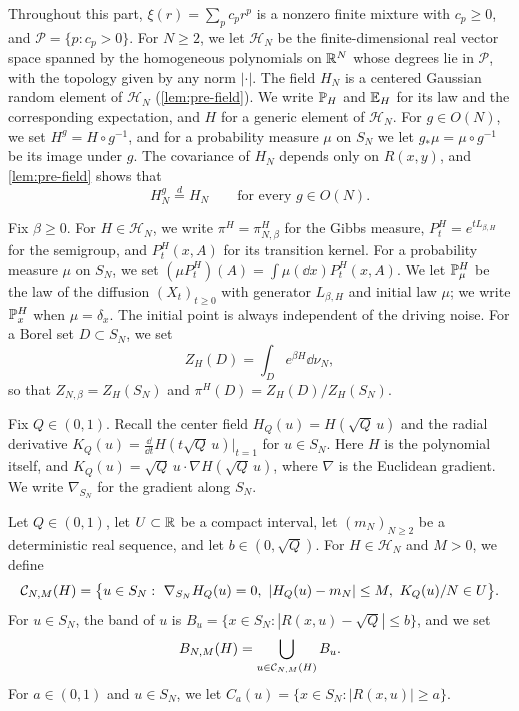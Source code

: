 Throughout this part, $\xi(r)=\sum_pc_pr^p$ is a nonzero finite mixture with $c_p\ge0$, and $\mathcal P=\{p:c_p>0\}$. For $N\ge2$, we let $\mathcal H_N$ be the finite-dimensional real vector space spanned by the homogeneous polynomials on $\mathbb R^N$ whose degrees lie in $\mathcal P$, with the topology given by any norm $|\cdot|$. The field $H_N$ is a centered Gaussian random element of $\mathcal H_N$ (\cref{lem:pre-field}). We write $\mathbb P_H$ and $\mathbb E_H$ for its law and the corresponding expectation, and $H$ for a generic element of $\mathcal H_N$. For $g\in O(N)$, we set $H^g=H\circ g^{-1}$, and for a probability measure $\mu$ on $S_N$ we let $g_*\mu=\mu\circ g^{-1}$ be its image under $g$. The covariance of $H_N$ depends only on $R(x,y)$, and \cref{lem:pre-field} shows that
\begin{equation}\label{eq:red-isotropy}
H_N^g\overset{d}{=}H_N\qquad\text{for every }g\in O(N).
\end{equation}

Fix $\beta\ge0$. For $H\in\mathcal H_N$, we write $\pi^H=\pi^H_{N,\beta}$ for the Gibbs measure, $P^H_t=e^{tL_{\beta,H}}$ for the semigroup, and $P^H_t(x,A)$ for its transition kernel. For a probability measure $\mu$ on $S_N$, we set $(\mu P^H_t)(A)=\int\mu(\dd x)P^H_t(x,A)$. We let $\mathbb P^H_\mu$ be the law of the diffusion $(X_t)_{t\ge0}$ with generator $L_{\beta,H}$ and initial law $\mu$; we write $\mathbb P^H_x$ when $\mu=\delta_x$. The initial point is always independent of the driving noise. For a Borel set $D\subset S_N$, we set
\begin{equation*}
Z_H(D)=\int_De^{\beta H}\dd\nu_N,
\end{equation*}
so that $Z_{N,\beta}=Z_H(S_N)$ and $\pi^H(D)=Z_H(D)/Z_H(S_N)$.

Fix $Q\in(0,1)$. Recall the center field $H_Q(u)=H(\sqrt Q\,u)$ and the radial derivative $K_Q(u)=\frac{\dd}{\dd t}H(t\sqrt Q\,u)\big|_{t=1}$ for $u\in S_N$. Here $H$ is the polynomial itself, and $K_Q(u)=\sqrt Q\,u\cdot\nabla H(\sqrt Q\,u)$, where $\nabla$ is the Euclidean gradient. We write $\nabla_{S_N}$ for the gradient along $S_N$.

\begin{definition}\label{def:red-centers}
Let $Q\in(0,1)$, let $U\subset\mathbb R$ be a compact interval, let $(m_N)_{N\ge2}$ be a deterministic real sequence, and let $b\in(0,\sqrt Q)$. For $H\in\mathcal H_N$ and $M>0$, we define
\begin{equation*}
\cC_{N,M}(H)=\bigl\{u\in S_N:\ \nabla_{S_N}H_Q(u)=0,\ |H_Q(u)-m_N|\le M,\ K_Q(u)/N\in U\bigr\}.
\end{equation*}
For $u\in S_N$, the band of $u$ is $B_u=\{x\in S_N:|R(x,u)-\sqrt Q|\le b\}$, and we set
\begin{equation*}
B_{N,M}(H)=\bigcup_{u\in\mathcal C_{N,M}(H)}B_u.
\end{equation*}
For $a\in(0,1)$ and $u\in S_N$, we let $C_a(u)=\{x\in S_N:|R(x,u)|\ge a\}$.
\end{definition}

